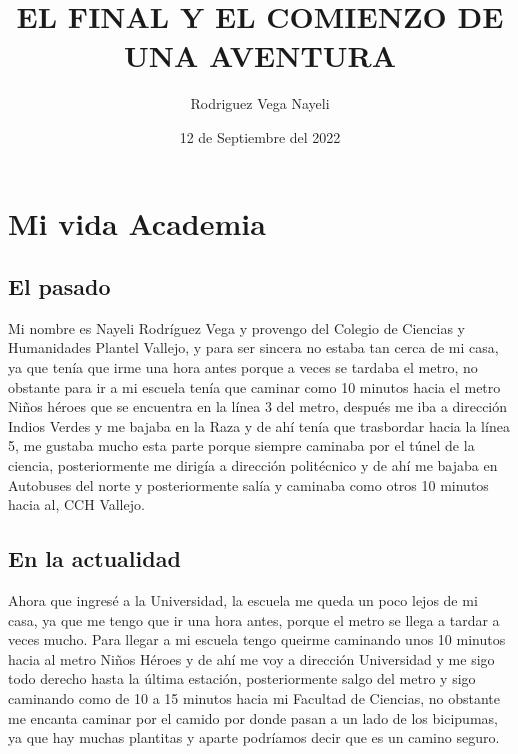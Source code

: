 \documentclass[letterpaper,12pt]{article}
\title{EL FINAL Y EL COMIENZO DE UNA AVENTURA}
\author{Rodriguez Vega Nayeli}
\date{12 de Septiembre del 2022 }
\begin{document}
\maketitle

\section{\Huge{Mi vida Academia}}
 \subsection{\Large{El pasado}}
 {\tiny Mi  {\normalsize nombre es Nayeli Rodríguez Vega} y provengo del  {\normalsize Colegio de Ciencias y Humanidades Plantel Vallejo}, y para ser sincera no estaba tan cerca de mi casa, ya que {\normalsize tenía que irme una hora antes porque a veces se tardaba el metro}, no obstante para ir a mi escuela    {\normalsize tenía que caminar como 10 minutos hacia el metro Niños héroes} que se encuentra en la línea 3 del metro, después me iba a {\normalsize dirección Indios Verdes y me bajaba en la Raza} y de ahí tenía que trasbordar hacia la {\normalsize línea 5}, me gustaba mucho esta parte porque  siempre caminaba por el túnel de la ciencia, posteriormente me dirigía a {\normalsize dirección politécnico y de ahí me bajaba en Autobuses} del norte y posteriormente {\normalsize salía y caminaba como otros 10 minutos hacia al, CCH Vallejo.}} 
  \subsection{\Large {En la actualidad}}
  {\small Ahora que ingresé a la Universidad, la escuela me queda un poco lejos de mi casa, ya que  {\large me tengo que ir una hora antes, porque el metro se llega a tardar a veces mucho}. Para llegar a mi escuela tengo que{\large irme caminando unos 10 minutos hacia al metro Niños Héroes} y de ahí me  voy a {\large dirección Universidad} y me sigo todo derecho  hasta la última estación, posteriormente {\large salgo del metro y sigo caminando como de 10 a 15 minutos hacia mi Facultad de Ciencias}, no obstante me encanta caminar por el camido  por donde pasan a un lado de los bicipumas, ya que hay muchas plantitas y aparte podríamos decir que es un camino seguro.}
\end{document}
